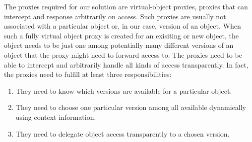 The proxies required for our solution are virtual-object proxies, proxies that can intercept and response arbitrarily on access.
Such proxies are usually not associated with a particular object or, in our case, version of an object.
When such a fully virtual object proxy is created for an exisiting or new object, the object needs to be just one among potentially many different versions of an object that the proxy might need to forward access to.
The proxies need to be able to intercept and arbitrarily handle all kinds of access transparently.
In fact, the proxies need to fulfill at least three responsibilities:
\begin{enumerate}
    \item They need to know which versions are available for a particular object.
    \item They need to choose one particular version among all available dynamically using context information.
    \item They need to delegate object access transparently to a chosen version.
\end{enumerate}



% 
% 
% 
% 
% 
% 
% 
% 
% 
% 
% 
% 




